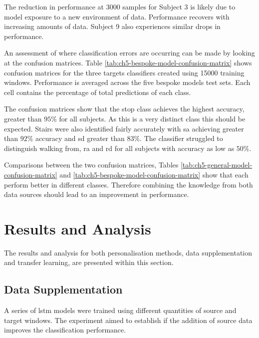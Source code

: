The reduction in performance at 3000 samples for Subject 3 is likely due to model exposure to a new environment of data. Performance recovers with increasing amounts of data. Subject 9 also experiences similar drops in performance.

An assessment of where classification errors are occurring can be made by looking at the confusion matrices. Table \ref{tab:ch5-bespoke-model-confusion-matrix} shows confusion matrices for the three targets classifiers created using 15000 training windows. Performance is averaged across the five bespoke models test sets. Each cell contains the percentage of total predictions of each class.

The confusion matrices show that the stop class achieves the highest accuracy, greater than $95\%$ for all subjects. As this is a very distinct class this should be expected. Stairs were also identified fairly accurately with \acrlong{sa} achieving greater than $92\%$ accuracy and \acrlong{sd} greater than $83\%$. The classifier struggled to distinguish walking from, \acrlong{ra} and \acrlong{rd} for all subjects with accuracy as low as $50\%$. 

Comparisons between the two confusion matrices, Tables \ref{tab:ch5-general-model-confusion-matrix} and \ref{tab:ch5-bespoke-model-confusion-matrix} show that each perform better in different classes. Therefore combining the knowledge from both data sources should lead to an improvement in performance.

\section{Results and Analysis}
\label{sec:model-personalisation-results}
The results and analysis for both personalisation methods, data supplementation and transfer learning, are presented within this section.

\subsection{Data Supplementation}
A series of \acrshort{lstm} models were trained using different quantities of source and target windows. The experiment aimed to establish if the addition of source data improves the classification performance.

